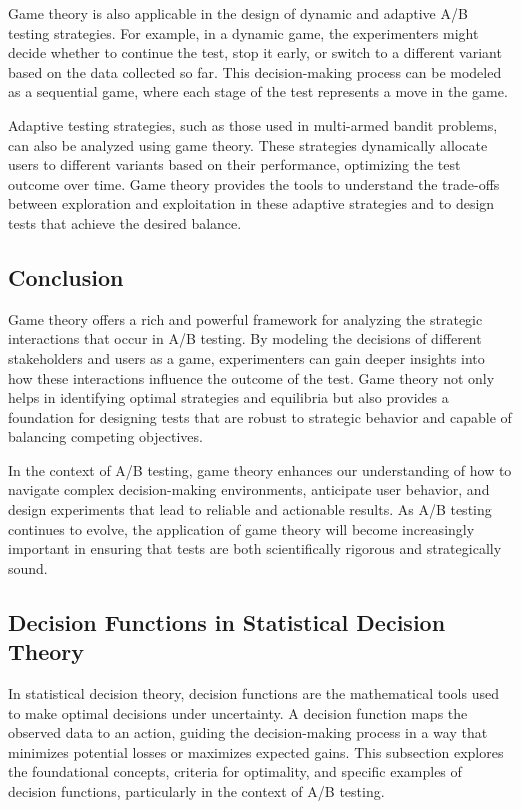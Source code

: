 \documentclass[magisterska, english]{pwr_wmat_praca_dyplomowa}
\theoremstyle{plain}
\numberwithin{theorem}{chapter}
\theoremstyle{definition}
\numberwithin{theorem}{chapter}
\begin{document}
Game theory is also applicable in the design of dynamic and adaptive A/B testing strategies. For example, in a dynamic game, the experimenters might decide whether to continue the test, stop it early, or switch to a different variant based on the data collected so far. This decision-making process can be modeled as a sequential game, where each stage of the test represents a move in the game.

Adaptive testing strategies, such as those used in multi-armed bandit problems, can also be analyzed using game theory. These strategies dynamically allocate users to different variants based on their performance, optimizing the test outcome over time. Game theory provides the tools to understand the trade-offs between exploration and exploitation in these adaptive strategies and to design tests that achieve the desired balance.


\subsection{Conclusion}
Game theory offers a rich and powerful framework for analyzing the strategic interactions that occur in A/B testing. By modeling the decisions of different stakeholders and users as a game, experimenters can gain deeper insights into how these interactions influence the outcome of the test. Game theory not only helps in identifying optimal strategies and equilibria but also provides a foundation for designing tests that are robust to strategic behavior and capable of balancing competing objectives.

In the context of A/B testing, game theory enhances our understanding of how to navigate complex decision-making environments, anticipate user behavior, and design experiments that lead to reliable and actionable results. As A/B testing continues to evolve, the application of game theory will become increasingly important in ensuring that tests are both scientifically rigorous and strategically sound.
\subsection{Decision Functions in Statistical Decision Theory}

In statistical decision theory, decision functions are the mathematical tools used to make optimal decisions under uncertainty. A decision function maps the observed data to an action, guiding the decision-making process in a way that minimizes potential losses or maximizes expected gains. This subsection explores the foundational concepts, criteria for optimality, and specific examples of decision functions, particularly in the context of A/B testing.
\end{document}

